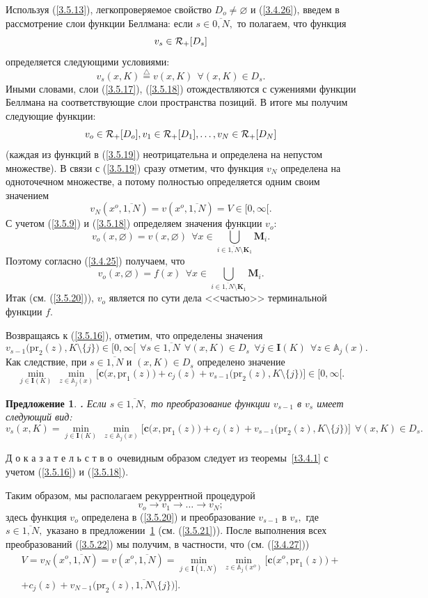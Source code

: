 \documentclass[11pt,twoside,openany]{report}
\newcommand{\bfn}{\begin{equation}}
\newcommand{\efn}{\end{equation}}
\newcommand{\df}{\stackrel{\triangle}{=}}
\newcommand{\ov}{\overline}
\newcounter{theo}
\newcounter{pred}
\newtheorem{pred}{Предложение}[section]
\newcommand{\TL}{\mbox{\bf{$\!\!$.}}}
\newcommand{\sm}{\setminus}
\newcommand{\fa}{\forall}
\newcommand{\clr}{{\cal R}}
\newcommand{\bba}{{\mathbb A}}
\newcommand{\emp}{\varnothing}
\begin{document}
{Используя (\ref{3.5.13}), легкопроверяемое свойство $D_o\neq \emp$ и (\ref{3.4.26}), введем
в рассмотрение слои функции Беллмана: если $s\in \ov{0,N},$ то полагаем, что функция
\bfn\label{3.5.17}v_s\in \clr_+[D_s]
\efn
определяется следующими условиями:
\bfn\label{3.5.18}v_s(x,K) \df v(x,K)\ \ \fa (x,K)\in D_s.
\efn
Иными словами, слои (\ref{3.5.17}), (\ref{3.5.18}) отождествляются с сужениями  функции
Беллмана на соответствующие слои пространства позиций. В итоге мы получим следующие функции:
\bfn\label{3.5.19}v_o\in \clr_+[D_o], v_1\in \clr_+[D_1],\ldots,v_N\in \clr_+[D_N]
\efn
(каждая из функций в (\ref{3.5.19}) неотрицательна и определена на непустом множестве).
В связи с (\ref{3.5.19}) сразу отметим, что функция $v_N$ определена на одноточечном множестве,
а потому полностью определяется одним своим значением
$$
v_N(x^o,\ov{1,N})= v(x^o,\ov{1,N}) = V\in [0,\infty[.
$$
С учетом (\ref{3.5.9}) и (\ref{3.5.18}) определяем значения функции $v_o$:
$$
v_o(x,\emp) = v(x,\emp)\ \ \fa x\in \bigcup\limits_{i\in \ov{1,N}\sm \mathbf{K}_1}\mathbf{M}_i.
$$
Поэтому согласно (\ref{3.4.25}) получаем, что
\bfn\label{3.5.20}v_o(x,\emp) = f(x)\ \ \fa x\in \bigcup\limits_{i\in \ov{1,N}\sm
\mathbf{K}_1}\mathbf{M}_i.
\efn
Итак (см. (\ref{3.5.20})), $v_o$ является  по сути дела <<частью>> терминальной функции $f.$

Возвращаясь к (\ref{3.5.16}), отметим, что определены значения
$$v_{s-1}\bigl(\mathrm{pr}_2(z),K\sm\{j\}\bigl)\in [0,\infty[\ \ \fa s \in \ov{1,N}\ \ \fa
(x,K)\in D_s\ \ \fa j\in \mathbf{I}(K)\ \ \fa z\in \bba_j(x).$$
Как следствие, при $s\in \ov{1,N}$ и $(x,K)\in D_s$ определено значение
$$\min\limits_{j\in\mathbf{I}(K)}\ \min\limits_{z\in \bba_j(x)}\bigl[\mathbf{c}\bigl(x,
\mathrm{pr}_1(z)\bigl) + c_j(z) + v_{s-1}\bigl(\mathrm{pr}_2(z),K\sm\{j\}\bigl)\bigl]\in [0,\infty[.
$$
\begin{pred}\label{p3.5.1}{\TL} Если $s\in \ov{1,N},$ то преобразование функции
$v_{s-1}$ в $v_s$ имеет следующий вид:
\bfn\label{3.5.21}v_s(x,K) = \min\limits_{j\in \mathbf{I}(K)}\ \min\limits_{z\in \bba_j(x)}
\bigl[\mathbf{c}\bigl(x,\mathrm{pr}_1(z)\bigl) + c_j(z) + v_{s-1}\bigl(\mathrm{pr}_2(z),
K\sm\{j\}\bigl)\bigl]\ \ \fa (x,K) \in D_s.
\efn
\end{pred}

Д о к а з а т е л ь с т в о\, очевидным образом следует из теоремы~\ref{t3.4.1} с учетом
(\ref{3.5.16}) и (\ref{3.5.18}).

Таким образом, мы располагаем рекуррентной процедурой
\bfn\label{3.5.22}v_o \longrightarrow v_1 \longrightarrow \ldots \longrightarrow v_N;
\efn
здесь функция $v_o$ определена в (\ref{3.5.20}) и преобразование $v_{s-1}$ в $v_s,$
где $s\in \ov{1,N},$ указано в предложении~\ref{p3.5.1} (см. (\ref{3.5.21})). После
выполнения всех преобразований (\ref{3.5.22}) мы получим, в частности, что (см. (\ref{3.4.27}))
 \begin{eqnarray}
&V = v_N(x^o,\ov{1,N}) = v(x^o,\ov{1,N}) =
\min\limits_{j\in \mathbf{I}(\overline{1,N})}\
\min\limits_{z\in \bba_j(x^o)} \bigl[\mathbf{c}\bigl(x^o,\mathrm{pr}_1(z)\bigl) +
&\nonumber\\
&+c_j(z) +
v_{N-1}\bigl(\mathrm{pr}_2(z),\ov{1,N}\sm\{j\}\bigl)\bigl].
\label{3.5.23}
\end{eqnarray}

}
\end{document}

